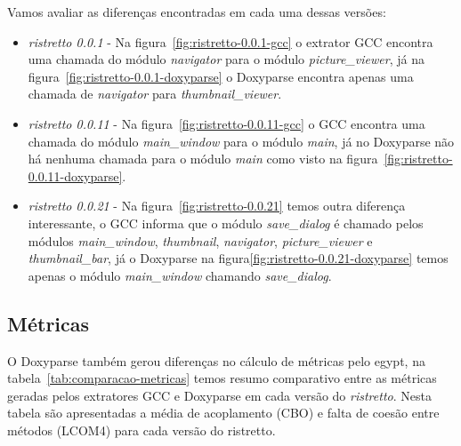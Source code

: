 Vamos avaliar as diferenças encontradas em cada uma dessas versões:

\begin{itemize}

\item {\it ristretto 0.0.1} - Na figura~\ref{fig:ristretto-0.0.1-gcc} o
extrator GCC encontra uma chamada do módulo {\it navigator} para o módulo {\it
picture\_viewer}, já na figura~\ref{fig:ristretto-0.0.1-doxyparse} o Doxyparse
encontra apenas uma chamada de {\it navigator} para {\it thumbnail\_viewer}.

\item {\it ristretto 0.0.11} - Na figura~\ref{fig:ristretto-0.0.11-gcc} o GCC
encontra uma chamada do módulo {\it main\_window} para o módulo {\it main}, já
no Doxyparse não há nenhuma chamada para o módulo {\it main} como visto na
figura~\ref{fig:ristretto-0.0.11-doxyparse}. 

\item {\it ristretto 0.0.21} - Na figura~\ref{fig:ristretto-0.0.21} temos outra
diferença interessante, o GCC informa que o módulo {\it save\_dialog} é chamado
pelos módulos {\it main\_window}, {\it thumbnail}, {\it navigator}, {\it
picture\_viewer} e {\it thumbnail\_bar}, já o Doxyparse na
figura\ref{fig:ristretto-0.0.21-doxyparse} temos apenas o módulo {\it
main\_window} chamando {\it save\_dialog}.

\end{itemize}

\subsection{Métricas}

O Doxyparse também gerou diferenças no cálculo de métricas pelo egypt, na
tabela~\ref{tab:comparacao-metricas} temos resumo comparativo entre as métricas
geradas pelos extratores GCC e Doxyparse em cada versão do {\it ristretto}.
Nesta tabela são apresentadas a média de acoplamento (CBO) e falta de coesão
entre métodos (LCOM4) para cada versão do ristretto.


